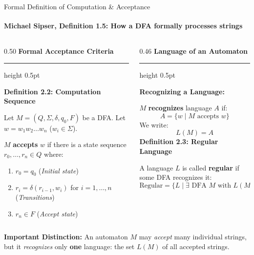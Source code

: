 \documentclass[aspectratio=169, 10pt]{beamer}
\newcommand{\colheader}[1]{%
  {\noindent\footnotesize\bfseries\color{gimpanavy}#1}%
  \vspace{0.02cm}%
  {\color{gimpanavy!30}\hrule height 0.5pt}%
  \vspace{0.05cm}%
}
\newcommand{\cardtitle}[1]{{\noindent\footnotesize\bfseries\color{gimpanavy}#1}\par\vspace{0.03cm}}
\newcommand{\greentitle}[1]{{\noindent\footnotesize\bfseries\color{accentGreen}#1}\par\vspace{0.03cm}}
\begin{document}
\begin{frame}{Formal Definition of Computation \& Acceptance}
  \framesubtitle{Michael Sipser, Definition 1.5: How a DFA formally processes strings}
  
  \begin{columns}[T]
    \begin{column}{0.50\textwidth}
      \colheader{Formal Acceptance Criteria}
      \begin{tcolorbox}[conceptcard]
        \cardtitle{Definition 2.2: Computation Sequence}
        {\scriptsize
        Let $M = (Q, \Sigma, \delta, q_0, F)$ be a DFA. Let $w = w_1 w_2 \dots w_n$ ($w_i \in \Sigma$).
        
        $M$ \textbf{accepts} $w$ if there is a state sequence $r_0, \dots, r_n \in Q$ where:
        \begin{enumerate}\setlength{\itemsep}{1.5pt}\scriptsize
          \item $r_0 = q_0$ \quad (\textit{Initial state})
          \item $r_{i} = \delta(r_{i-1}, w_i)$ for $i = 1, \dots, n$ \quad (\textit{Transitions})
          \item $r_n \in F$ \quad (\textit{Accept state})
        \end{enumerate}
        }
      \end{tcolorbox}
    \end{column}
    
    \begin{column}{0.46\textwidth}
      \colheader{Language of an Automaton}
      \begin{tcolorbox}[examplecard]
        \greentitle{Recognizing a Language:}
        {\scriptsize
        $M$ \textbf{recognizes} language $A$ if:
        \[ A = \{w \mid M \text{ accepts } w\} \]
        We write:
        \[ L(M) = A \]
        }
        \greentitle{Definition 2.3: Regular Language}
        {\scriptsize
        A language $L$ is called \textbf{regular} if some DFA recognizes it:
        \[ \text{Regular} = \{L \mid \exists \text{ DFA } M \text{ with } L(M) = L\} \]
        }
      \end{tcolorbox}
    \end{column}
  \end{columns}
  
  \vspace{0.02cm}
  \begin{tcolorbox}[alertcard]
    {\scriptsize\textbf{Important Distinction:} An automaton $M$ may \textit{accept} many individual strings, but it \textit{recognizes} only \textbf{one} language: the set $L(M)$ of all accepted strings.}
  \end{tcolorbox}
\end{frame}
\end{document}
